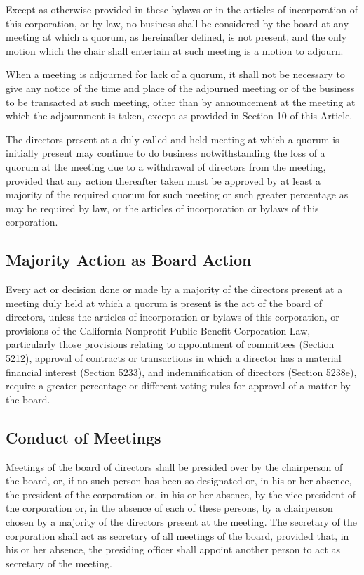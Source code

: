 \documentclass{article}
\begin{document}
	Except as otherwise provided in these bylaws or in the articles of incorporation of this corporation, or by law, no business shall be considered by the board at any meeting at which a quorum, as hereinafter defined, is not present, and the only motion which the chair shall entertain at such meeting is a motion to adjourn.
	
	When a meeting is adjourned for lack of a quorum, it shall not be necessary to give any notice of the time and place of the adjourned meeting or of the business to be transacted at such meeting, other than by announcement at the meeting at which the adjournment is taken, except as provided in Section 10 of this Article.
	
	The directors present at a duly called and held meeting at which a quorum is initially present may continue to do business notwithstanding the loss of a quorum at the meeting due to a withdrawal of directors from the meeting, provided that any action thereafter taken must be approved by at least a majority of the required quorum for such meeting or such greater percentage as may be required by law, or the articles of incorporation or bylaws of this corporation.
	
	\subsection{Majority Action as Board Action}
	Every act or decision done or made by a majority of the directors present at a meeting duly held at which a quorum is present is the act of the board of directors, unless the articles of incorporation or bylaws of this corporation, or provisions of the California Nonprofit Public Benefit Corporation Law, particularly those provisions relating to appointment of committees (Section 5212), approval of contracts or transactions in which a director has a material financial interest (Section 5233), and indemnification of directors (Section 5238e), require a greater percentage or different voting rules for approval of a matter by the board.
	
	\subsection{Conduct of Meetings}
	Meetings of the board of directors shall be presided over by the chairperson of the board, or, if no such person has been so designated or, in his or her absence, the president of the corporation or, in his or her absence, by the vice president of the corporation or, in the absence of each of these persons, by a chairperson chosen by a majority of the directors present at the meeting. The secretary of the corporation shall act as secretary of all meetings of the board, provided that, in his or her absence, the presiding officer shall appoint another person to act as secretary of the meeting.
	
\end{document}
